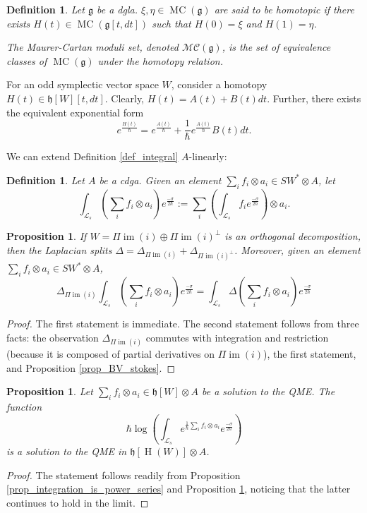 \documentclass[]{amsart}
\newtheorem{proposition}[theorem]{Proposition}
\newtheorem{definition}[theorem]{Definition}
\theoremstyle{definition}
\newcommand{\MC}{\operatorname{MC}}
\newcommand{\im}{\operatorname{im}}
\newcommand{\homology}{\operatorname{H}}
\begin{document}
\begin{definition}
Let $\mathfrak{g}$ be a dgla. $\xi,\eta\in\MC(\mathfrak{g})$ are said to be homotopic if there exists $H(t)\in\MC(\mathfrak{g}[t,dt])$ such that $H(0)=\xi$ and $H(1)=\eta$.

The Maurer-Cartan moduli set, denoted $\mathcal{MC}(\mathfrak{g})$, is the set of equivalence classes of $\MC(\mathfrak{g})$ under the homotopy relation.
\end{definition}

For an odd symplectic vector space $W$, consider a homotopy $H(t)\in\mathfrak{h}[W][t,dt]$. Clearly, $H(t)=A(t)+B(t)dt$. Further, there exists the equivalent exponential form
\[
e^{\frac{H(t)}{\hbar}} = e^{\frac{A(t)}{\hbar}} + \frac{1}{\hbar}e^{\frac{A(t)}{\hbar}}B(t)dt.
\]

We can extend Definition \ref{def_integral} $A$-linearly:

\begin{definition}\label{def_A_linear_integration}
Let $A$ be a cdga. Given an element $\sum_i f_i\otimes a_i\in S W^* \otimes A$, let
\[
\int_{\mathcal{L}_s} \left(\sum_i f_i \otimes a_i \right) e^{\frac{-\sigma}{2\hbar}} := \sum_i \left(\int_{\mathcal{L}_s} f_i e^{\frac{-\sigma}{2\hbar}} \right) \otimes a_i.
\]
\end{definition}

\begin{proposition}\label{prop_laplacian_inside_integral}
If $W=\Pi \im(i)\oplus \Pi \im(i)^\perp$ is an orthogonal decomposition, then the Laplacian splits $\Delta=\Delta_{\Pi \im(i)}+\Delta_{\Pi \im(i)^\perp}$. Moreover, given an element $\sum_i f_i\otimes a_i\in S W^* \otimes A$,
\[
\Delta_{\Pi \im (i)} \int_{\mathcal{L}_s} \left(\sum_i f_i \otimes a_i \right) e^{\frac{-\sigma}{2\hbar}} = \int_{\mathcal{L}_s} \Delta \left(\sum_i f_i \otimes a_i \right) e^{\frac{-\sigma}{2\hbar}}
\]
\end{proposition}
\begin{proof}
The first statement is immediate. The second statement follows from three facts: the observation $\Delta_{\Pi \im(i)}$ commutes with integration and restriction (because it is composed of partial derivatives on $\Pi \im(i)$), the first statement, and Proposition \ref{prop_BV_stokes}.
\end{proof}

\begin{proposition}\label{prop_A_linear_BV}
Let $\sum_i f_i\otimes a_i \in \mathfrak{h}[W] \otimes A$ be a solution to the QME. The function
\[
\hbar \log \left(\int_{\mathcal{L}_s} e^{\frac{1}{\hbar} \sum_i f_i\otimes a_i} e^{\frac{-\sigma}{2\hbar}} \right)
\]
is a solution to the QME in $\mathfrak{h}[\homology (W)]\otimes A$.
\end{proposition}
\begin{proof}
The statement follows readily from Proposition \ref{prop_integration_is_power_series} and Proposition \ref{prop_laplacian_inside_integral}, noticing that the latter continues to hold in the limit.
\end{proof}
\end{document}

